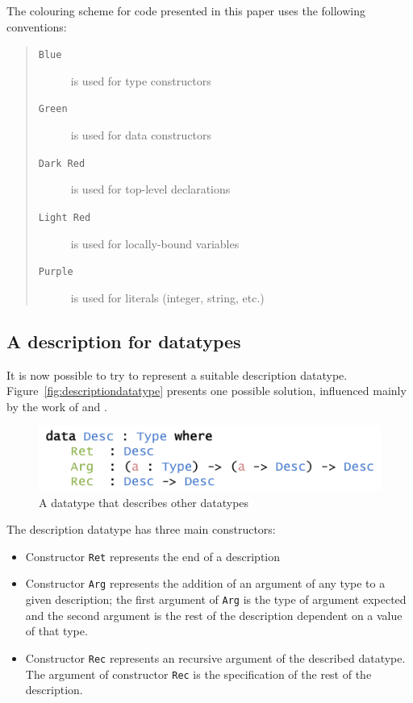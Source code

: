 \documentclass{ituthesis}
\newcommand{\ttconstructor}[1]{\textcolor{constructor-color}{\texttt{#1}}}
\newcommand{\tttype}[1]{\textcolor{type-color}{\texttt{#1}}}
\newcommand{\ttdec}[1]{\textcolor{declared-var-color}{\texttt{#1}}}
\newcommand{\ttvar}[1]{\textcolor{local-var-color}{\texttt{#1}}}
\newcommand{\ttliteral}[1]{\textcolor{literal-color}{\texttt{#1}}}
\newenvironment{asideblock}
  {\begin{mdframed}[style=0,%
      leftline=false,rightline=false,leftmargin=2em,rightmargin=2em,%
          innerleftmargin=0pt,innerrightmargin=0pt,linewidth=0.75pt,%
      skipabove=7pt,skipbelow=7pt]\small}
  {\end{mdframed}}
\begin{document}
\begin{asideblock}
  The colouring scheme for code presented in this paper uses the following conventions:
  \begin{quote}
  \begin{description}
    \item[\tttype{Blue}] is used for type constructors
    \item[\ttconstructor{Green}] is used for data constructors
    \item[\ttdec{Dark Red}] is used for top-level declarations
    \item[\ttvar{Light Red}] is used for locally-bound variables
    \item[\ttliteral{Purple}] is used for literals (integer, string, etc.)
  \end{description}
  \end{quote}

\end{asideblock}

\subsection{A description for datatypes}
\label{sub:ADescriptionforDatatypes}
It is now possible to try to represent a suitable description datatype. Figure~\ref{fig:descriptiondatatype} presents one possible solution, influenced mainly by the work of \cite{mcbride2010ornamental} and \cite{diehl2014eliminators}.

\begin{figure}[ht]
\begin{center}
    \includegraphics[scale=0.5]{Figures/ADescriptionforDatatypesSimple.png}
\end{center}
\caption{A datatype that describes other datatypes}
\label{fig:simpldescdatatype}
\end{figure}

The description datatype has three main constructors:
\begin{itemize}
  \item  Constructor \ttconstructor{Ret} represents the end of a description
  \item  Constructor \ttconstructor{Arg} represents the addition of an argument of any type to a given description; the first argument of \ttconstructor{Arg} is the type of argument expected and the second argument is the rest of the description dependent on a value of that type.
  \item  Constructor \ttconstructor{Rec} represents an recursive argument of the described datatype. The argument of constructor \ttconstructor{Rec} is the specification of the rest of the description.
\end{itemize}
\end{document}
